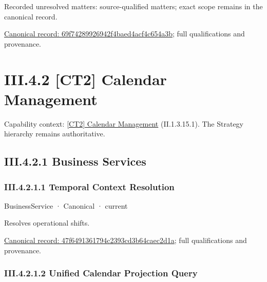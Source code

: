 {\small Recorded unresolved matters: source-qualified matters; exact scope remains in the canonical record.}\par
{\footnotesize \href{../../../../continuum/business/business-process/69f74289926942f4baed4acf4c654a3b.md}{Canonical record: 69f74289926942f4baed4acf4c654a3b}; full qualifications and provenance.}\par
\section*{III.4.2 [CT2] Calendar Management}
\label{navigation:III.4.2}

{\small Capability context: \hyperref[element:7669036f7e6749219412fc64df5f7064]{[CT2] Calendar Management} (II.1.3.15.1). The Strategy hierarchy remains authoritative.}\par
\subsection*{III.4.2.1 Business Services}
\label{navigation:III.4.2.1}

\subsubsection*{III.4.2.1.1 Temporal Context Resolution}
\label{navigation:III.4.2.1.1}

\label{element:47f6491361794c2393cd3b64caec2d1a}
{\small BusinessService · Canonical · current}\par

Resolves operational shifts.


{\footnotesize \href{../../../../continuum/business/business-service/47f6491361794c2393cd3b64caec2d1a.md}{Canonical record: 47f6491361794c2393cd3b64caec2d1a}; full qualifications and provenance.}\par
\subsubsection*{III.4.2.1.2 Unified Calendar Projection Query}
\label{navigation:III.4.2.1.2}

